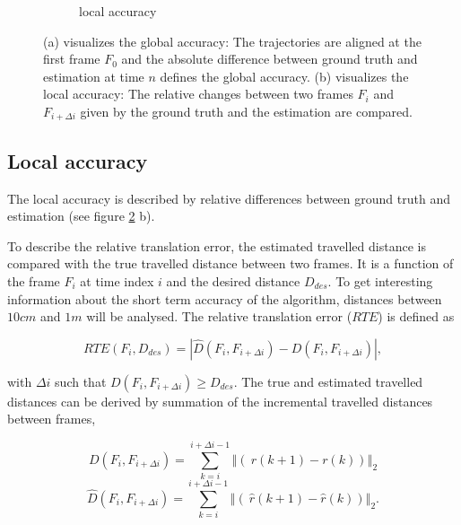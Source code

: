 \begin{figure}
\begin{subfigure}[b]{0.28\textwidth}
    \caption{local accuracy}
    \label{fig:4}
  \end{subfigure}
  \hspace*{1cm}
\caption{(a) visualizes the global accuracy: The trajectories are aligned at the first frame $F_{0}$ and the absolute difference between ground truth and estimation at time $n$ defines the global accuracy. (b) visualizes the local accuracy: The relative changes between two frames $F_i$ and $F_{i+\Delta i}$ given by the ground truth and the estimation are compared.}
\label{pics:absolute_relative}
\end{figure}





\subsection{Local accuracy}
\label{sec:local}

The local accuracy is described by relative differences between ground truth and estimation (see figure \ref{pics:absolute_relative} b). 

To describe the relative translation error, the estimated travelled distance is compared with the true travelled distance between two frames. It is a function of the frame $F_i$ at time index $i$ and the desired distance $D_{des}$. To get interesting information about the short term accuracy of the algorithm, distances between $10cm$ and $1m$ will be analysed. The relative translation error ($RTE$) is defined as

\begin{equation}
RTE \left( F_i, D_{des} \right) = \left| \hat{D} \left( F_i, F_{i+\Delta i} \right) - D \left( F_i, F_{i+\Delta i} \right)\right| ,
\end{equation}

with $ \Delta i $ such that $ D \left( F_i, F_{i+\Delta i} \right) \geq D_{des} $. The true and estimated travelled distances can be derived by summation of the incremental travelled distances between frames,

\begin{equation}
       D \left( F_i, F_{i+\Delta i} \right) = \sum_{k=i}^{i+\Delta i-1} \left\Vert\left(\ r \left( k+1 \right) - r \left( k \right) \right) \right\Vert_2
\end{equation}
\begin{equation}
       \hat{D} \left( F_i, F_{i+\Delta i} \right) = \sum_{k=i}^{i+\Delta i-1} \left\Vert\left(\ \hat{r} \left( k+1 \right) - \hat{r} \left( k \right) \right) \right\Vert_2 .
\end{equation}

